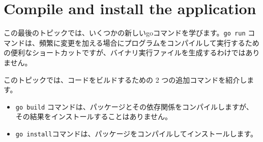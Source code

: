 \section{Compile and install the application}

この最後のトピックでは、いくつかの新しいgoコマンドを学びます。\texttt{go run} コマンドは、頻繁に変更を加える場合にプログラムをコンパイルして実行するための便利なショートカットですが、バイナリ実行ファイルを生成するわけではありません。

このトピックでは、コードをビルドするための 2 つの追加コマンドを紹介します。

\begin{itemize}
\item \texttt{go build} コマンドは、パッケージとその依存関係をコンパイルしますが、その結果をインストールすることはありません。
\item \texttt{go install}コマンドは、パッケージをコンパイルしてインストールします。
\end{itemize}

